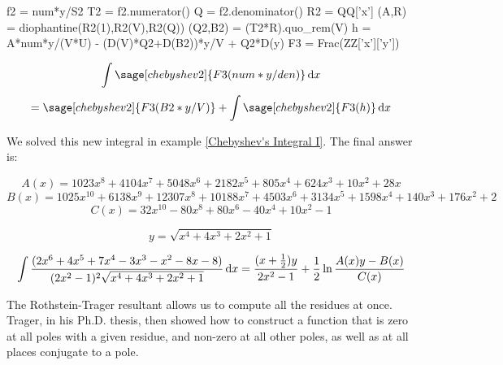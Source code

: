 \begin{sageblock}[chebyshev2]
f2 = num*y/S2
T2 = f2.numerator()
Q = f2.denominator()
R2 = QQ['x']
(A,R) = diophantine(R2(1),R2(V),R2(Q))
(Q2,B2) = (T2*R).quo_rem(V)
h = A*num*y/(V*U) - (D(V)*Q2+D(B2))*y/V + Q2*D(y)
F3 = Frac(ZZ['x']['y'])
\end{sageblock}

$$\int \sage[chebyshev2]{F3(num*y/den)}\,{\rm d}x$$
$$=\sage[chebyshev2]{F3(B2*y/V)} + \int \sage[chebyshev2]{F3(h)}\,{\rm d}x$$

We solved this new integral in example \ref{Chebyshev's Integral I}.
The final answer is:

$$A(x) = 1023x^8+4104x^7+5048x^6+2182x^5+805x^4+624x^3+10x^2+28x$$
$$B(x) = 1025x^{10} + 6138x^9 + 12307x^8 + 10188x^7 + 4503x^6 + 3134x^5 + 1598x^4 + 140x^3 + 176x^2 +2$$
$$C(x) = 32x^{10}-80x^8+80x^6-40x^4+10x^2-1$$

$$y = \sqrt{x^4+4 x^3+2 x^2+1}$$

$$\int {{(2x^6+4x^5+7x^4-3x^3-x^2-8x-8)}\over{(2x^2-1)^2\sqrt{x^4+4 x^3+2 x^2+1}}} \,{\rm d}x
= {{(x+{1\over2})y}\over{2x^2-1}} + {1\over2}\ln{{A(x)y - B(x)}\over{C(x)}}
$$

\endexample


\vfill\eject
{}

The Rothstein-Trager resultant allows us to compute all the residues
at once.  Trager, in his Ph.D. thesis, then showed how to construct a
function that is zero at all poles with a given residue, and non-zero
at all other poles, as well as at all places conjugate to a pole.
